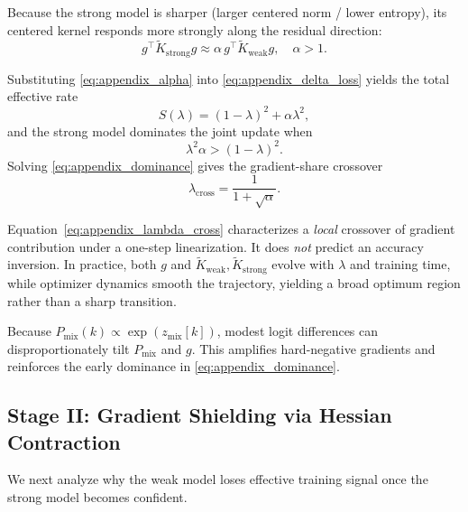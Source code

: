 \begin{assumption}
Because the strong model is sharper (larger centered norm / lower entropy), its centered kernel responds more strongly along the residual direction:
\begin{equation}
    g^\top \tilde{K}_{\mathrm{strong}} g \approx \alpha \, g^\top \tilde{K}_{\mathrm{weak}} g, \quad \alpha > 1.
    \label{eq:appendix_alpha}
\end{equation}
\end{assumption}

Substituting \eqref{eq:appendix_alpha} into \eqref{eq:appendix_delta_loss} yields the total effective rate
\begin{equation}
    S(\lambda) = (1-\lambda)^2 + \alpha \lambda^2,
    \label{eq:appendix_total_rate}
\end{equation}
and the strong model dominates the joint update when
\begin{equation}
    \lambda^2 \alpha > (1-\lambda)^2.
    \label{eq:appendix_dominance}
\end{equation}
Solving \eqref{eq:appendix_dominance} gives the gradient-share crossover
\begin{equation}
    \lambda_{\text{cross}} = \frac{1}{1+\sqrt{\alpha}}.
    \label{eq:appendix_lambda_cross}
\end{equation}

\begin{remark}
Equation~\eqref{eq:appendix_lambda_cross} characterizes a \emph{local} crossover of gradient contribution under a one-step linearization. It does \emph{not} predict an accuracy inversion. In practice, both $g$ and $\tilde{K}_{\mathrm{weak}}, \tilde{K}_{\mathrm{strong}}$ evolve with $\lambda$ and training time, while optimizer dynamics smooth the trajectory, yielding a broad optimum region rather than a sharp transition.
\end{remark}

\begin{remark}
Because $P_{\mathrm{mix}}(k) \propto \exp(z_{\text{mix}}[k])$, modest logit differences can disproportionately tilt $P_{\mathrm{mix}}$ and $g$. This amplifies hard-negative gradients and reinforces the early dominance in \eqref{eq:appendix_dominance}.
\end{remark}

\subsection{Stage II: Gradient Shielding via Hessian Contraction}
We next analyze why the weak model loses effective training signal once the strong model becomes confident.


